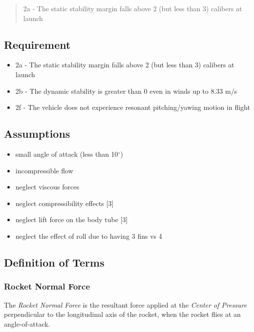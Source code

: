\documentclass[]{article}
\providecommand{\tightlist}{%
  \setlength{\itemsep}{0pt}\setlength{\parskip}{0pt}}
\begin{document}
\begin{quote}
2a - The static stability margin falls above 2 (but less than 3)
calibers at launch
\end{quote}

\subsection{Requirement}\label{requirement}

\begin{itemize}
\tightlist
\item
  2a - The static stability margin falls above 2 (but less than 3)
  calibers at launch
\item
  2b - The dynamic stability is greater than 0 even in winds up to 8.33
  m/s
\item
  2f - The vehicle does not experience resonant pitching/yawing motion
  in flight
\end{itemize}

\subsection{Assumptions}\label{assumptions-2}

\begin{itemize}
\tightlist
\item
  small angle of attack (less than 10\(^\circ\))
\item
  incompressible flow
\item
  neglect viscous forces
\item
  neglect compressibility effects {[}3{]}
\item
  neglect lift force on the body tube {[}3{]}
\item
  neglect the effect of roll due to having 3 fins vs 4
\end{itemize}

\subsection{Definition of Terms}\label{definition-of-terms}

\subsubsection{Rocket Normal Force}\label{rocket-normal-force}

The \emph{Rocket Normal Force} is the resultant force applied at the
\emph{Center of Pressure} perpendicular to the longitudinal axis of the
rocket, when the rocket flies at an angle-of-attack.
\end{document}
